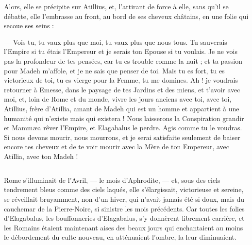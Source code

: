 \documentclass[a4paper, 11pt, oneside, polutonikogreek, french]{article}
\begin{document}
Alors, elle se précipite sur Atillius, et, l'attirant de force à elle, sans qu'il se débatte, elle l'embrasse au front, au bord de ses cheveux châtains, en une folie qui secoue ses seins :

--- Vois-tu, tu vaux plus que moi, tu vaux plus que nous tous. Tu sauverais l'Empire si tu étais l'Empereur et je serais ton Epouse si tu voulais. Je ne vois pas la profondeur de tes pensées, car tu es trouble comme la nuit ; et ta passion pour Madeh m'affole, et je ne sais que penser de toi. Mais tu es fort, tu es victorieux de toi, tu es vierge pour la Femme, tu me domines. Ah ! je voudrais retourner à Emesse, dans le paysage de tes Jardins et des miens, et t'avoir avec moi, et, loin de Rome et du monde, vivre les jours anciens avec toi, avec toi, Atillius, frère d'Atillia, amant de Madeh qui est un homme et appartient à une humanité qui n'existe mais qui existera ! Nous laisserons la Conspiration grandir et Mammæa rêver l'Empire, et Elagabalus le perdre. Agis comme tu le voudras. Si nous devons mourir, nous mourrons, et je serai satisfaite seulement de baiser encore tes cheveux et de te voir mourir avec la Mère de ton Empereur, avec Atillia, avec ton Madeh !
\clearpage
\subsection{}
\paragraph{}
Rome s'illuminait de l'Avril, --- le mois d'Aphrodite, --- et, sous des ciels tendrement bleus comme des ciels laqués, elle s'élargissait, victorieuse et sereine, se réveillait bruyamment, non d'un hiver, qui n'avait jamais été si doux, mais du cauchemar de la Pierre-Noire, si sinistre les mois précédents. Car toutes les folies d'Elagabalus, les bouffonneries d'Elagabalus, s'y donnèrent librement carrière, et les Romains étaient maintenant aises des beaux jours qui enchantaient au moins le débordement du culte nouveau, en atténuaient l'ombre, la leur diminuaient.
\end{document}
